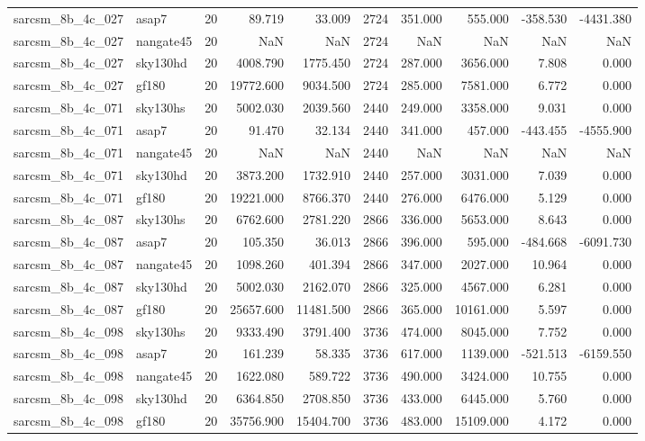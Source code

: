 \documentclass{article}
\begin{document}
\begin{longtable}{llrrrrrrrr}
sarcsm\_8b\_4c\_027 & asap7 & 20 & 89.719 & 33.009 & 2724 & 351.000 & 555.000 & -358.530 & -4431.380 \\
sarcsm\_8b\_4c\_027 & nangate45 & 20 & NaN & NaN & 2724 & NaN & NaN & NaN & NaN \\
sarcsm\_8b\_4c\_027 & sky130hd & 20 & 4008.790 & 1775.450 & 2724 & 287.000 & 3656.000 & 7.808 & 0.000 \\
sarcsm\_8b\_4c\_027 & gf180 & 20 & 19772.600 & 9034.500 & 2724 & 285.000 & 7581.000 & 6.772 & 0.000 \\
sarcsm\_8b\_4c\_071 & sky130hs & 20 & 5002.030 & 2039.560 & 2440 & 249.000 & 3358.000 & 9.031 & 0.000 \\
sarcsm\_8b\_4c\_071 & asap7 & 20 & 91.470 & 32.134 & 2440 & 341.000 & 457.000 & -443.455 & -4555.900 \\
sarcsm\_8b\_4c\_071 & nangate45 & 20 & NaN & NaN & 2440 & NaN & NaN & NaN & NaN \\
sarcsm\_8b\_4c\_071 & sky130hd & 20 & 3873.200 & 1732.910 & 2440 & 257.000 & 3031.000 & 7.039 & 0.000 \\
sarcsm\_8b\_4c\_071 & gf180 & 20 & 19221.000 & 8766.370 & 2440 & 276.000 & 6476.000 & 5.129 & 0.000 \\
sarcsm\_8b\_4c\_087 & sky130hs & 20 & 6762.600 & 2781.220 & 2866 & 336.000 & 5653.000 & 8.643 & 0.000 \\
sarcsm\_8b\_4c\_087 & asap7 & 20 & 105.350 & 36.013 & 2866 & 396.000 & 595.000 & -484.668 & -6091.730 \\
sarcsm\_8b\_4c\_087 & nangate45 & 20 & 1098.260 & 401.394 & 2866 & 347.000 & 2027.000 & 10.964 & 0.000 \\
sarcsm\_8b\_4c\_087 & sky130hd & 20 & 5002.030 & 2162.070 & 2866 & 325.000 & 4567.000 & 6.281 & 0.000 \\
sarcsm\_8b\_4c\_087 & gf180 & 20 & 25657.600 & 11481.500 & 2866 & 365.000 & 10161.000 & 5.597 & 0.000 \\
sarcsm\_8b\_4c\_098 & sky130hs & 20 & 9333.490 & 3791.400 & 3736 & 474.000 & 8045.000 & 7.752 & 0.000 \\
sarcsm\_8b\_4c\_098 & asap7 & 20 & 161.239 & 58.335 & 3736 & 617.000 & 1139.000 & -521.513 & -6159.550 \\
sarcsm\_8b\_4c\_098 & nangate45 & 20 & 1622.080 & 589.722 & 3736 & 490.000 & 3424.000 & 10.755 & 0.000 \\
sarcsm\_8b\_4c\_098 & sky130hd & 20 & 6364.850 & 2708.850 & 3736 & 433.000 & 6445.000 & 5.760 & 0.000 \\
sarcsm\_8b\_4c\_098 & gf180 & 20 & 35756.900 & 15404.700 & 3736 & 483.000 & 15109.000 & 4.172 & 0.000 \\

\end{longtable}
\end{document}
